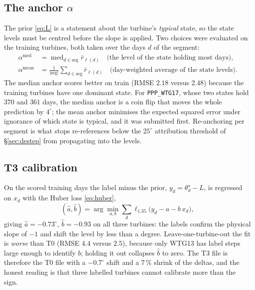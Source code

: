 \documentclass[11pt,a4paper]{article}
\theoremstyle{remark}
\newcommand{\med}{\operatorname{med}}
\newcommand{\dg}{^{\circ}}
\newcommand{\code}[1]{\texttt{#1}}
\begin{document}
\subsection{The anchor $\alpha$}
The prior \eqref{eq:L} is a statement about the turbine's \emph{typical} state,
so the state levels must be centred before the slope is applied. Two choices
were evaluated on the training turbines, both taken over the days $d$ of the
segment:
\begin{align}
  \alpha^{\mathrm{med}} &= \med_{d\in\mathrm{seg}} \bar r_{\ell(d)}
  \quad\text{(the level of the state holding most days),}\\
  \alpha^{\mathrm{mean}} &= \frac{1}{|\mathrm{seg}|}\sum_{d\in\mathrm{seg}} \bar r_{\ell(d)}
  \quad\text{(day-weighted average of the state levels).}
\end{align}
The median anchor scores better on train (RMSE $2.18$ versus $2.48$) because the
training turbines have one dominant state. For \code{PPP\_WTG17}, whose two
states hold $370$ and $361$ days, the median anchor is a coin flip that moves the
whole prediction by $4\dg$; the mean anchor minimises the expected squared
error under ignorance of which state is typical, and it was submitted first.
Re-anchoring per segment is what stops re-references below the $25\dg$
attribution threshold of \S\ref{sec:destep} from propagating into the levels.

\subsection{T3 calibration}\label{sec:t3}
On the scored training days the label minus the prior, $y_d=\theta^\star_d-L$,
is regressed on $x_d$ with the Huber loss \eqref{eq:huber},
\begin{equation}
  (\hat a,\hat b) = \arg\min_{a,b} \sum_d \ell_{1.35}\big(y_d - a - b\,x_d\big),
\end{equation}
giving $\hat a=-0.73\dg$, $\hat b=-0.93$ on all three turbines: the labels
confirm the physical slope of $-1$ and shift the level by less than a degree.
Leave-one-turbine-out the fit is \emph{worse} than T0 (RMSE $4.4$ versus $2.5$),
because only WTG13 has label steps large enough to identify $b$; holding it
out collapses $\hat b$ to zero. The T3 file is therefore the T0 file with a
$-0.7\dg$ shift and a $7\,\%$ shrink of the deltas, and the honest reading is
that three labelled turbines cannot calibrate more than the sign.
\end{document}
